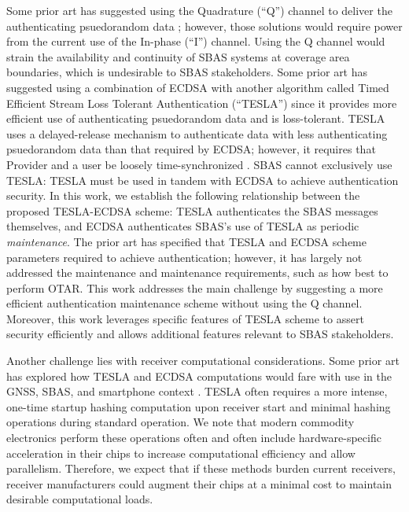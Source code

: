 \documentclass[APA,STIX1COL]{IONjournal/ION-APA Template}
\begin{document}
	Some prior art has suggested using the Quadrature (``Q'') channel to deliver the authenticating psuedorandom data \cite{todd-pki-scheme, other_schemes}; however, those solutions would require power from the current use of the In-phase (``I'') channel.
	Using the Q channel would strain the availability and continuity of SBAS systems at coverage area boundaries, which is undesirable to SBAS stakeholders.
	Some prior art has suggested using a combination of ECDSA with another algorithm called Timed Efficient Stream Loss Tolerant Authentication (``TESLA'') \cite{Neish_Dissertation, gal-os-tesla} since it provides more efficient use of authenticating psuedorandom data and is loss-tolerant.
	TESLA uses a delayed-release mechanism to authenticate data with less authenticating psuedorandom data than that required by ECDSA; however, it requires that Provider and a user be loosely time-synchronized \cite{perrig2005timed}.
	SBAS cannot exclusively use TESLA: TESLA must be used in tandem with ECDSA to achieve authentication security.
	In this work, we establish the following relationship between the proposed TESLA-ECDSA scheme: TESLA authenticates the SBAS messages themselves, and ECDSA authenticates SBAS's use of TESLA as periodic {\em maintenance}.
	The prior art has specified that TESLA and ECDSA scheme parameters required to achieve authentication; however, it has largely not addressed the maintenance and maintenance requirements, such as how best to perform OTAR.
	This work addresses the main challenge by suggesting a more efficient authentication maintenance scheme without using the Q channel.
	Moreover, this work leverages specific features of TESLA scheme to assert security efficiently \cite{chain-security} and allows additional features relevant to SBAS stakeholders.

	Another challenge lies with receiver computational considerations.
	Some prior art has explored how TESLA and ECDSA computations would fare with use in the GNSS, SBAS, and smartphone context \cite{tesla-cpus}.
	TESLA often requires a more intense, one-time startup hashing computation upon receiver start and minimal hashing operations during standard operation.
	We note that modern commodity electronics perform these operations often and often include hardware-specific acceleration in their chips to increase computational efficiency and allow parallelism.
	Therefore, we expect that if these methods burden current receivers, receiver manufacturers could augment their chips at a minimal cost to maintain desirable computational loads.
\end{document}

